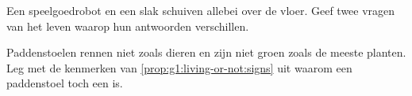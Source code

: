 \begin{exercise}[$\star\star$]\label{exo:g1:living-or-not:9}
Een speelgoedrobot en een slak schuiven allebei over de vloer. Geef
twee vragen van het leven waarop hun antwoorden verschillen.
\end{exercise}

\begin{exercise}[$\star\star$]\label{exo:g1:living-or-not:10}
Paddenstoelen rennen niet zoals dieren en zijn niet groen zoals de
meeste planten. Leg met de kenmerken van
\cref{prop:g1:living-or-not:signs} uit waarom een paddenstoel toch een
 is.
\end{exercise}
